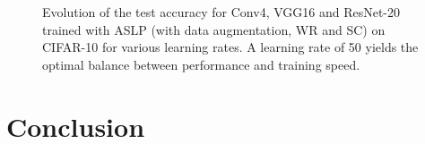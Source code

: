 \begin{figure}[htbp]
\centering
{}
  \caption{Evolution of the test accuracy for Conv4, VGG16 and ResNet-20 trained
  with ASLP (with data augmentation, \ac{WR} and \ac{SC}) on CIFAR-10 for various learning
  rates. A learning rate of 50 yields the optimal balance between performance
  and training speed.}
\label{fig:chap2:lr_impact}
\end{figure}


\section{Conclusion}

